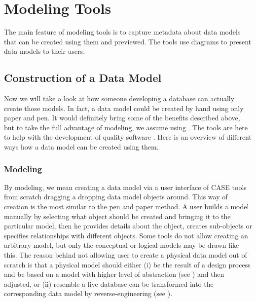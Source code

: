 \chapter{Modeling Tools}
\label{modeling_tools}

The main feature of modeling tools is to capture metadata about data models that can be created using them and previewed. The tools use diagrams to present data models to their users.

\section{Construction of a Data Model}

Now we will take a look at how someone developing a database can actually create those models.
In fact, a data model could be created by hand using only paper and pen. It would definitely bring some of the benefits described above, but to take the full advantage of modeling, we assume using . The tools are here to help with the development of quality software \cite{CASETools}. 
Here is an overview of different ways how a data model can be created using them.

\subsection{Modeling}

By modeling, we mean creating a data model via a user interface of CASE tools from scratch dragging a dropping data model objects around. 
This way of creation is the most similar to the pen and paper method. A user builds a model manually by selecting what object should be created and bringing it to the particular model, then he provides details about the object, creates sub-objects or specifies relationships with different objects.
Some tools do not allow creating an arbitrary model, but only the conceptual or logical models may be drawn like this. 
The reason behind not allowing user to create a physical data model out of scratch is that a physical model should either (i) be the result of a design process and be based on a model with higher level of abstraction (see ) and then adjusted, or (ii) resemble a live database can be transformed into the corresponding data model by reverse-engineering (see ).

